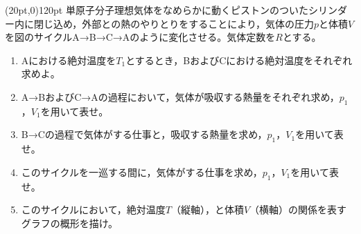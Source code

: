 \hakosyokika
\item
    \begin{mawarikomi}(20pt,0){120pt}{}
        単原子分子理想気体をなめらかに動くピストンのついたシリンダー内に閉じ込め，外部との熱のやりとりをすることにより，気体の圧力$p$と体積$V$を図のサイクルA→B→C→Aのように変化させる。気体定数を$R$とする。
        \begin{enumerate}
            \item Aにおける絶対温度を$T_1$とするとき，BおよびCにおける絶対温度をそれぞれ求めよ。
            \item A→BおよびC→Aの過程において，気体が吸収する熱量をそれぞれ求め，$p_1$，$V_1$を用いて表せ。
            \item B→Cの過程で気体がする仕事と，吸収する熱量を求め，$p_1$，$V_1$を用いて表せ。
            \item このサイクルを一巡する間に，気体がする仕事を求め，$p_1$，$V_1$を用いて表せ。
            \item このサイクルにおいて，絶対温度$T$（縦軸），と体積$V$（横軸）の関係を表すグラフの概形を描け。
        \end{enumerate}
    \end{mawarikomi}